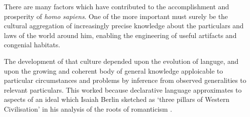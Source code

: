 There are many factors which have contributed to the accomplishment and prosperity of \emph{homo sapiens}.
One of the more important must surely be the cultural aggregation of increasingly precise knowledge about the particulars and laws of the world around him, enabling the engineering of useful artifacts and congenial habitats.

The development of that culture depended upon the evolution of languge, and upon the growing and coherent body of general knowledge apploicable to particular circumstances and problems by inference from observed generalities to relevant particulars.
This worked because declarative language approximates to aspects of an ideal which Isaiah Berlin sketched as `three pillars of Western Civilisation' in his analysis of the roots of romanticism \cite{berlinRR}.
